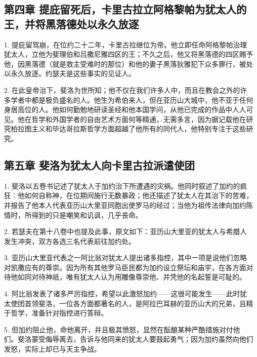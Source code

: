 \subsection{第四章 提庇留死后，卡里古拉立阿格黎帕为犹太人的王，并将黑落德处以永久放逐}

1. 提庇留驾崩，在位约二十二年，卡里古拉继位为帝。他立即任命阿格黎帕治理犹太人，立他为斐理伯和吕撒尼雅四区的王；不久之后，他又将黑落德的四区赐予他，因黑落德（就是救主受难时的那位）和他的妻子黑落狄雅犯下众多罪行，被处以永久放逐。约瑟夫是这些事实的见证人。\par

2. 在此皇帝治下，斐洛为世所知；他不仅在我们许多人中，而且在教会之外的许多学者中都是极负盛名的人。他生为希伯来人，但在亚历山大城中，他不亚于任何身居高位的人。他如何勤勉地研读圣经和他本国学问，从他已完成的作品中人人可见。他在哲学和外国学者的自由艺术方面何等精通，无需多言，因为据记载他在研究柏拉图主义和毕达哥拉斯哲学方面超越了他所有的同代人，他特别专注于这些研究。\par


\subsection{第五章 斐洛为犹太人向卡里古拉派遣使团}

1. 斐洛以五卷书记述了犹太人于加约治下所遭遇的灾祸。他同时叙述了加约的疯狂：他如何自称神，在位期间施行无数暴政；他还描述了犹太人在其治下的苦难，并报告了他本人代表亚历山大里亚同胞出使罗马的经过；当他为祖传法律向加约陈情时，所得到的只是嘲笑和讥讽，几乎丧命。\par

2. 若瑟夫在第十八卷中也提及此事，原文如下：亚历山大里亚的犹太人与希腊人发生冲突，双方各选三名代表前往加约处。\par

3. 亚历山大里亚代表之一阿比翁对犹太人提出诸多指控，其中一项是说他们忽略对凯撒应有的尊崇。因为所有其他罗马臣民都为加约设立祭坛和庙宇，在各方面对待他如同对待神祇，唯有犹太人认为用雕像尊崇他、并凭他的名起誓是可耻的。\par

4. 阿比翁发表了诸多严厉指控，希望以此激怒加约——这很可能发生——此时犹太使团首领斐洛，一位各方面都著名的人，是阿拉巴耳赫的亚历山大的兄弟，且精于哲学，准备针对指控进行答辩。\par

5. 但加约阻止他，命他离开，并且极其愤怒，显然在酝酿某种严酷措施对付他们。斐洛蒙受侮辱离去，告诉与他同来的犹太人要鼓起勇气；因为加约虽然向他们发怒，实际上却已与天主争战。\par

